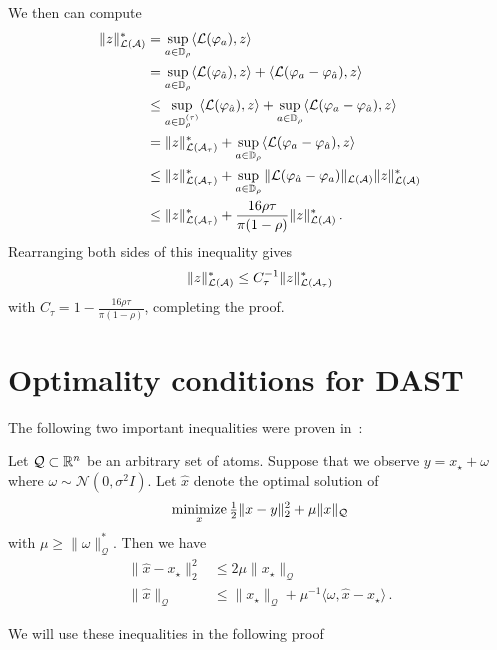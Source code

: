 We then can compute
\begin{align*}
\|z\|_{\mathcal{L}(\mathcal{A})}^* &= \sup_{a \in \mathbb{D}_\rho} \langle \mathcal{L}(\varphi_a),z \rangle\\
&= \sup_{a \in \mathbb{D}_\rho} \langle \mathcal{L}(\varphi_{\hat{a}}), z \rangle + \langle \mathcal{L}(\varphi_{a}-\varphi_{\hat{a}}), z\rangle \\
&\leq\sup_{a \in \mathbb{D}_\rho^{(\tau)}} \langle \mathcal{L}(\varphi_{\hat{a}}), z \rangle +\sup_{a \in \mathbb{D}_\rho}\langle \mathcal{L}(\varphi_a-\varphi_{\hat{a}}), z\rangle \\
&= \|z\|_{\mathcal{L}(\mathcal{A}_\tau)}^*+ \sup_{a \in \mathbb{D}_\rho}\langle \mathcal{L}(\varphi_a-\varphi_{\hat{a}}), z\rangle \\
&\leq \|z\|_{\mathcal{L}(\mathcal{A}_\tau)}^*+ \sup_{a \in \mathbb{D}_\rho}  \| \mathcal{L}(\varphi_{\hat{a}}-\varphi_a)\|_{\mathcal{L}(\mathcal{A})} \|z\|_{\mathcal{L}(\mathcal{A})}^*\\
&\leq \|z\|_{\mathcal{L}(\mathcal{A}_\tau)}^*+ \frac{16\rho\tau}{\pi(1-\rho)} \|z\|_{\mathcal{L}(\mathcal{A})}^*\,.
\end{align*}
Rearranging both sides of this inequality gives
\[
	\|z\|_{\mathcal{L}(\mathcal{A})}^* \leq C_\tau^{-1} \|z\|_{\mathcal{L}(\mathcal{A}_\tau)}^*
\]
with $C_\tau =  1-\tfrac{16\rho\tau}{\pi(1-\rho)}$, completing the proof.

\section{Optimality conditions for DAST}
The following two important inequalities were proven in~\cite[Section 2]{BhaskarAllerton11}:
\begin{theorem}\label{thm:badri}
Let $\mathcal{Q}\subset \mathbb{R}^n$ be an arbitrary set of atoms.  Suppose that we observe $y = x_\star+\omega$ where $\omega\sim \mathcal{N}(0,\sigma^2 I)$.  Let $\hat{x}$ denote the optimal solution of
\[
	\mathop{\operatorname{minimize}}_x \tfrac{1}{2}\|x-y\|_2^2 + \mu \|x\|_\mathcal{Q}
\]
with  $\mu \geq\|\omega\|_{\mathcal{Q}}^*$.  Then we have
\begin{align}
	 \|\hat{x}-x_\star\|_2^2 &\leq 2 \mu \|x_\star\|_{\mathcal{Q}}\\
	 \|\hat{x}\|_{\mathcal{Q}} &\leq \|x_\star\|_{\mathcal{Q}} + \mu^{-1} \langle \omega, \hat{x}-x_\star\rangle\,.
\end{align}
\end{theorem}
We will use these inequalities in the following proof

